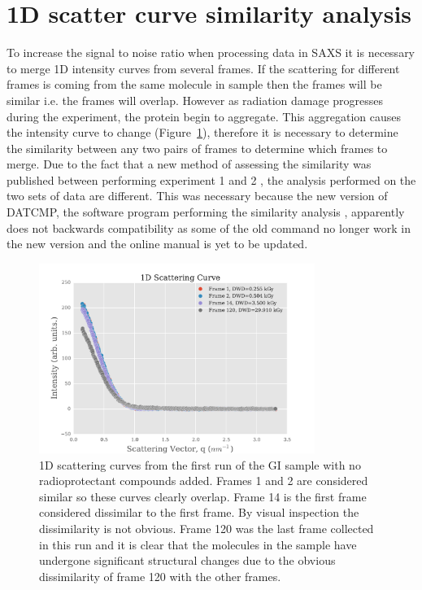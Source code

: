 \section{1D scatter curve similarity analysis}
\label{sec:1D scatter curve similarity analysis}
To increase the signal to noise ratio when processing data in SAXS it is necessary to merge 1D intensity curves from several frames.
If the scattering for different frames is coming from the same molecule in sample then the frames will be similar i.e. the frames will overlap.
However as radiation damage progresses during the experiment, the protein begin to aggregate.
This aggregation causes the intensity curve to change (Figure~\ref{fig:1D Scatter Curves}), therefore it is necessary to determine the similarity between any two pairs of frames to determine which frames to merge.
Due to the fact that a new method of assessing the similarity was published between performing experiment 1 and 2 \cite{franke2015correlation}, the analysis performed on the two sets of data are different.
This was necessary because the new version of DATCMP, the software program performing the similarity analysis \cite{petoukhov2012new}, apparently does not backwards compatibility as some of the old command no longer work in the new version and the online manual is yet to be updated.
\begin{figure}
    \centering
    \includegraphics[width=0.8\textwidth]{figures/saxs/scatter_curves.pdf}
    \caption{1D scattering curves from the first run of the GI sample with no radioprotectant compounds added. Frames 1 and 2 are considered similar so these curves clearly overlap. Frame 14 is the first frame considered dissimilar to the first frame. By visual inspection the dissimilarity is not obvious. Frame 120 was the last frame collected in this run and it is clear that the molecules in the sample have undergone significant structural changes due to the obvious dissimilarity of frame 120 with the other frames.}
    \label{fig:1D Scatter Curves}
\end{figure}

